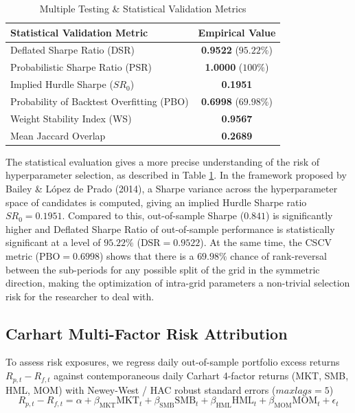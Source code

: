 \documentclass[11pt,a4paper]{article}
\begin{document}
\begin{table}[htbp]
\centering
\caption{Multiple Testing \& Statistical Validation Metrics}
\label{tab:overfitting}
\begin{tabular}{lc}
\toprule
\textbf{Statistical Validation Metric} & \textbf{Empirical Value} \\
\midrule
Deflated Sharpe Ratio (DSR) & \textbf{0.9522} ($95.22\%$) \\
Probabilistic Sharpe Ratio (PSR) & \textbf{1.0000} ($100\%$) \\
Implied Hurdle Sharpe ($SR_0$) & \textbf{0.1951} \\
Probability of Backtest Overfitting (PBO) & \textbf{0.6998} ($69.98\%$) \\
Weight Stability Index (WS) & \textbf{0.9567} \\
Mean Jaccard Overlap & \textbf{0.2689} \\
\bottomrule
\end{tabular}
\end{table}

The statistical evaluation gives a more precise understanding of the risk of hyperparameter selection, as described in Table \ref{tab:overfitting}. In the framework proposed by Bailey \& López de Prado (2014), a Sharpe variance across the hyperparameter space of candidates is computed, giving an implied Hurdle Sharpe ratio $SR_0 = 0.1951$. Compared to this, out-of-sample Sharpe ($0.841$) is significantly higher and Deflated Sharpe Ratio of out-of-sample performance is statistically significant at a level of $95.22\%$ ($\text{DSR} = 0.9522$). At the same time, the CSCV metric ($\text{PBO} = 0.6998$) shows that there is a $69.98\%$ chance of rank-reversal between the sub-periods for any possible split of the grid in the symmetric direction, making the optimization of intra-grid parameters a non-trivial selection risk for the researcher to deal with.

\subsection{Carhart Multi-Factor Risk Attribution}
To assess risk exposures, we regress daily out-of-sample portfolio excess returns $R_{p, t} - R_{f, t}$ against contemporaneous daily Carhart 4-factor returns (MKT, SMB, HML, MOM) with Newey-West / HAC robust standard errors ($maxlags=5$)
\begin{equation} R_{p, t} - R_{f, t} = \alpha + \beta_{\text{MKT}} \text{MKT}_t + \beta_{\text{SMB}} \text{SMB}_t + \beta_{\text{HML}} \text{HML}_t + \beta_{\text{MOM}} \text{MOM}_t + \epsilon_{t} \end{equation}
\end{document}
